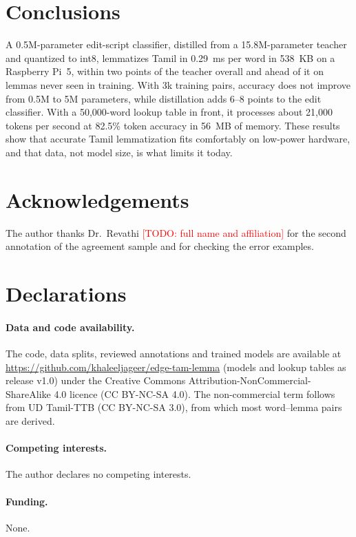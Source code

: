 \documentclass{sadhana}
\newcommand{\todo}[1]{\textcolor{red}{[TODO: #1]}}
\begin{document}
\section{Conclusions}

A 0.5M-parameter edit-script classifier, distilled from a 15.8M-parameter
teacher and quantized to int8, lemmatizes Tamil in 0.29~ms per word in 538~KB
on a Raspberry Pi~5, within two points of the teacher overall and ahead of it
on lemmas never seen in training. With 3k training pairs, accuracy does not
improve from 0.5M to 5M parameters, while distillation adds 6--8 points to the
edit classifier. With a 50,000-word lookup table in front, it processes about
21,000 tokens per second at 82.5\% token accuracy in 56~MB of memory. These
results show that accurate Tamil lemmatization fits comfortably on low-power
hardware, and that data, not model size, is what limits it today.

\section*{Acknowledgements}

The author thanks Dr.\ Revathi \todo{full name and affiliation} for the second
annotation of the agreement sample and for checking the error examples.

\section*{Declarations}

\paragraph{Data and code availability.}
The code, data splits, reviewed annotations and trained models are
available at \url{https://github.com/khaleeljageer/edge-tam-lemma} (models and
lookup tables as release v1.0) under the
Creative Commons Attribution-NonCommercial-ShareAlike 4.0 licence
(CC BY-NC-SA 4.0). The non-commercial term follows from UD Tamil-TTB
(CC BY-NC-SA 3.0), from which most word--lemma pairs are derived.

\paragraph{Competing interests.} The author declares no competing interests.

\paragraph{Funding.} None.
\end{document}
